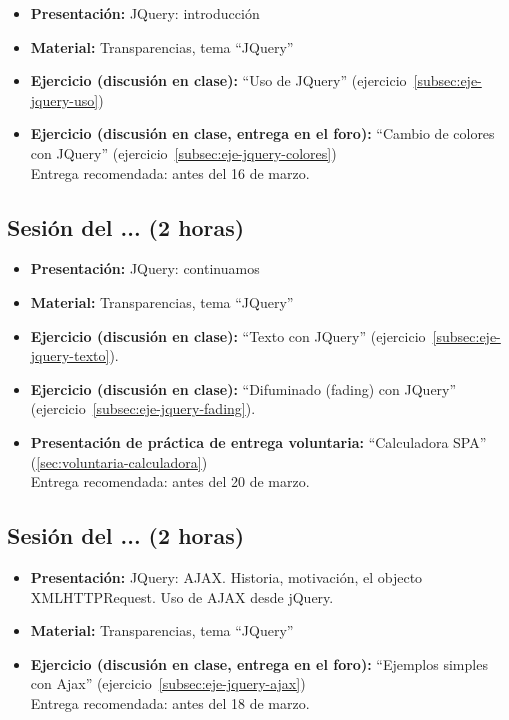\documentclass[a4paper,12pt]{report}
\begin{document}
\begin{itemize}
\item \textbf{Presentación:} JQuery: introducción
\item \textbf{Material:} Transparencias, tema ``JQuery''
\item \textbf{Ejercicio (discusión en clase):} ``Uso de JQuery'' (ejercicio~\ref{subsec:eje-jquery-uso})
\item \textbf{Ejercicio (discusión en clase, entrega en el foro):} ``Cambio de colores con JQuery'' (ejercicio~\ref{subsec:eje-jquery-colores}) \\
  Entrega recomendada: antes del 16 de marzo.
\end{itemize}

\subsection{Sesión del ... (2 horas)}

\begin{itemize}
\item \textbf{Presentación:} JQuery: continuamos
\item \textbf{Material:} Transparencias, tema ``JQuery''
\item \textbf{Ejercicio (discusión en clase):} ``Texto con JQuery'' (ejercicio~\ref{subsec:eje-jquery-texto}).
\item \textbf{Ejercicio (discusión en clase):} ``Difuminado (fading) con JQuery'' (ejercicio~\ref{subsec:eje-jquery-fading}).
\item \textbf{Presentación de práctica de entrega voluntaria:} ``Calculadora SPA'' (\ref{sec:voluntaria-calculadora}) \\
  Entrega recomendada: antes del 20 de marzo.
\end{itemize}


\subsection{Sesión del ... (2 horas)}

\begin{itemize}
\item \textbf{Presentación:} JQuery: AJAX. Historia, motivación, el objecto XMLHTTPRequest. Uso de AJAX desde jQuery.
\item \textbf{Material:} Transparencias, tema ``JQuery''
\item \textbf{Ejercicio (discusión en clase, entrega en el foro):} ``Ejemplos simples con Ajax'' (ejercicio~\ref{subsec:eje-jquery-ajax}) \\
  Entrega recomendada: antes del 18 de marzo.
\end{itemize}
\end{document}
